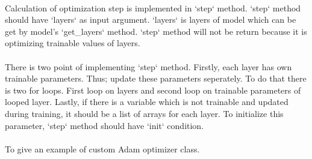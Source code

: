 \documentclass[12pt]{report}
\begin{document}
\paragraph{}
Calculation of optimization step is implemented in `step` method. `step` method should have `layers` as input argument. `layers` is layers of model which can be get by model's `get\_layers` method. `step` method will not be return because it is optimizing trainable values of layers. 

\paragraph{}
There is two point of implementing `step` method. Firstly, each layer has own trainable parameters. Thus; update these parameters seperately. To do that there is two for loops. First loop on layers and second loop on trainable parameters of looped layer. Lastly, if there is a variable which is not trainable and updated during training, it should be a list of arrays for each layer. To initialize this parameter, `step` method should have `init` condition. 

\paragraph{}
To give an example of custom Adam optimizer class.
\end{document}
